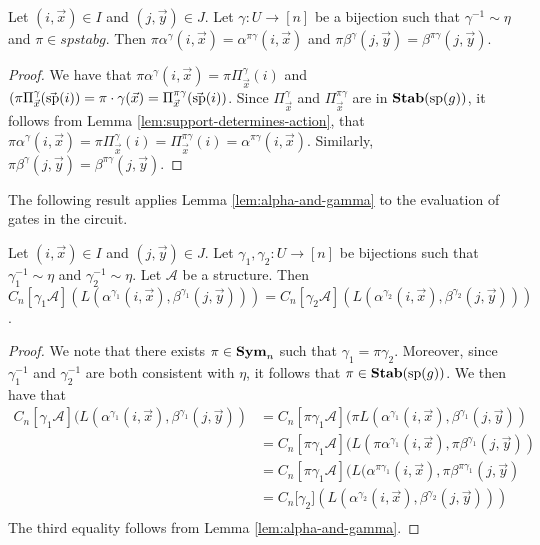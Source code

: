 \documentclass[../paper.tex]{subfiles}
\begin{document}
\begin{lem}
  \label{lem:alpha-and-gamma}
  Let $(i,\vec{x}) \in I$ and $(j, \vec{y}) \in J$. Let $\gamma: U \rightarrow
  [n]$ be a bijection such that $\gamma^{-1} \sim \eta$ and $\pi \in spstab{g}$.
  Then $\pi \alpha^{\gamma}(i, \vec{x}) = \alpha^{\pi \gamma}(i, \vec{x})$ and
  $\pi \beta^{\gamma}(j, \vec{y}) = \beta^{\pi \gamma}(j, \vec{y})$.
\end{lem}
\begin{proof}
  We have that $\pi \alpha^{\gamma}(i, \vec{x}) = \pi \Pi^{\gamma}_{\vec{x}}(i)$
  and $(\pi \Pi^{\gamma}_{\vec{x}}(\vec{\text{sp}}(i)) = \pi \cdot \gamma (\vec{x})
  = \Pi^{\pi \gamma}_{\vec{x}}(\vec{\text{sp}}(i))$. Since $\Pi^{\gamma}_{\vec{x}}$
  and $\Pi^{\pi \gamma}_{\vec{x}}$ are in $\text{\textbf{Stab}} (\text{sp} (g))$, it follows from Lemma
  \ref{lem:support-determines-action}, that $\pi \alpha^{\gamma}(i, \vec{x}) =
  \pi \Pi^{\gamma}_{\vec{x}} (i) = \Pi^{\pi \gamma}_{\vec{x}}(i) = \alpha^{\pi
    \gamma}(i, \vec{x})$. Similarly, $\pi \beta^{\gamma}(j, \vec{y}) =
  \beta^{\pi \gamma} (j, \vec{y})$.
\end{proof}

The following result applies Lemma \ref{lem:alpha-and-gamma} to the evaluation
of gates in the circuit.

\begin{lem}
  \label{lem:alpha-ind-gamma}
  Let $(i,\vec{x}) \in I$ and $(j, \vec{y}) \in J$. Let $\gamma_1, \gamma_2: U
  \rightarrow [n]$ be bijections such that $\gamma^{-1}_1 \sim \eta$ and
  $\gamma^{-1}_2 \sim \eta$. Let $\mathcal{A}$ be a structure. Then
  $C_n[\gamma_1 \mathcal{A}] (L(\alpha^{\gamma_1}(i, \vec{x}),
  \beta^{\gamma_1}(j, \vec{y}))) = C_n[\gamma_2 \mathcal{A}]
  (L(\alpha^{\gamma_2}(i, \vec{x}), \beta^{\gamma_2}(j, \vec{y})))$.
\end{lem}
\begin{proof}
  We note that there exists $\pi \in \text{\textbf{Sym}}_n$ such that $\gamma_1 = \pi
  \gamma_2$. Moreover, since $\gamma^{-1}_1$ and $\gamma^{-1}_2$ are both
  consistent with $\eta$, it follows that $\pi \in \text{\textbf{Stab}} (\text{sp} (g))$. We then have
  that
  \begin{align*}
    C_n[\gamma_1 \mathcal{A}](L(\alpha^{\gamma_1}(i, \vec{x}), \beta^{\gamma_1}(j,
    \vec{y})) &= C_n[\pi \gamma_1 \mathcal{A}](\pi L(\alpha^{\gamma_1}(i, \vec{x}),
                \beta^{\gamma_1}(j, \vec{y})) \\
              &= C_n[\pi \gamma_1 \mathcal{A}](L(\pi
                \alpha^{\gamma_1}(i, \vec{x}), \pi \beta^{\gamma_1}(j, \vec{y}))\\
              &= C_n[\pi
                \gamma_1 \mathcal{A}](L(\alpha^{\pi \gamma_1}(i, \vec{x}), \pi \beta^{\pi
                \gamma_1}(j, \vec{y})\\
              &= C_n[\gamma_2 \mathcal] (L(\alpha^{\gamma_2}(i,
                \vec{x}), \beta^{\gamma_2}(j, \vec{y})))\\
  \end{align*}The third equality follows from Lemma \ref{lem:alpha-and-gamma}.
\end{proof}
\end{document}
